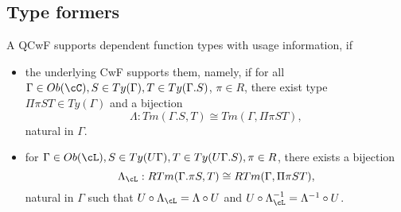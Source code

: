 \documentclass[12pt,a4paper]{article}
\def\rfl{_{refl}}\alwaysmath{rfl}
\renewcommand{\O}{_{O}}
\newcommand{\R}{\ensuremath{_{R}}}
\begin{document}
%    
%    
%    
%  

\subsection*{Type formers}


\begin{definition}
  A QCwF supports dependent function types with usage information, if
  \begin{itemize}
    
    \item the underlying CwF \cC supports them, namely, if for all $\Gamma \in \ob\cC, S \in Ty(\Gamma), T \in Ty(\Gamma . S)$, $\pi \in R$, there exist type $\Pi\pi S T \in Ty(\Gamma)$ and a bijection $$\Lambda : Tm(\Gamma.S, T) \cong Tm(\Gamma, \Pi\pi S T) \label{eq:dep-prod-cwf},$$ natural in $\Gamma$.
    
    \item for $\Gamma \in \ob\cL, S \in Ty(U\Gamma), T \in Ty(U\Gamma . S), \pi \in R$, there exists a bijection $$\Lambda_\cL : RTm(\Gamma.\pi S, T) \cong RTm(\Gamma, \Pi\pi S T) \label{eq:dep-prod-qcwf},$$ natural in $\Gamma$ such that $U \comp \Lambda_\cL = \Lambda \comp U$ and $U \comp \Lambda^{-1}_\cL = \Lambda^{-1}\comp U$.    
  
  \end{itemize}  
\end{definition}
\end{document}
